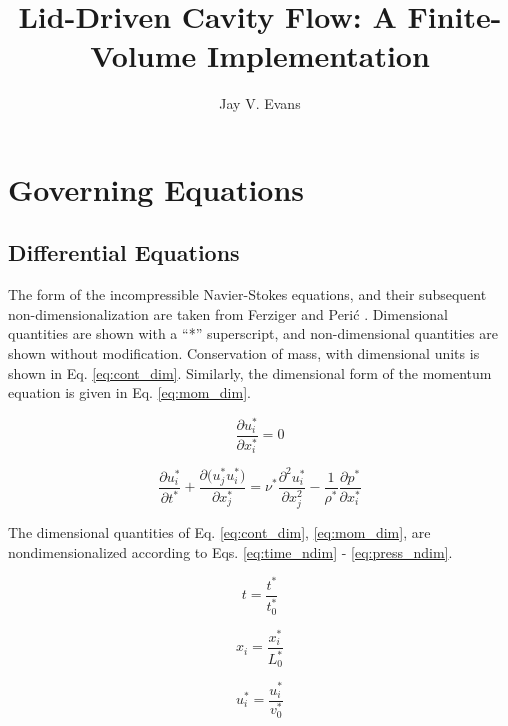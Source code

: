 \documentclass[10pt, letterpaper]{article}
\title{Lid-Driven Cavity Flow: A Finite-Volume Implementation}
\date{}
\author{Jay V. Evans}
\begin{document}
\maketitle


\section{Governing Equations}

\subsection{Differential Equations}

The form of the incompressible Navier-Stokes equations, and their subsequent non-dimensionalization are taken from Ferziger and Perić \cite{Ferziger_Springer_2002}. Dimensional quantities are shown with a ``*'' superscript, and non-dimensional quantities are shown without modification. Conservation of mass, with dimensional units is shown in Eq. \ref{eq:cont_dim}. Similarly, the dimensional form of the momentum equation is given in Eq. \ref{eq:mom_dim}.

\begin{equation}
  \frac{\partial{u_{i}^{*}}}{\partial{x_{i}^{*}}} = 0
  \label{eq:cont_dim}
\end{equation}

\begin{equation}
  \frac{\partial{u_{i}^{*}}}{\partial{t^{*}}} + \frac{\partial{(u_{j}^{*}}u_{i}^{*})}{\partial{x_{j}^{*}}} ={\nu^{*}}\frac{\partial^{2}{u_{i}^{*}}}{\partial{x_{j}^{2}}} - \frac{1}{\rho^{*}}\frac{\partial{p^{*}}}{\partial{x_{i}^{*}}}
  \label{eq:mom_dim}
\end{equation}

The dimensional quantities of Eq. \ref{eq:cont_dim}, \ref{eq:mom_dim}, are nondimensionalized according to Eqs. \ref{eq:time_ndim} - \ref{eq:press_ndim}.

\begin{equation}
  t = \frac{t^{*}}{t_{0}^{*}}
  \label{eq:time_ndim}
\end{equation}


\begin{equation}
  x_{i} = \frac{x_{i}^{*}}{L_{0}^{*}}
  \label{eq:dist_ndim}
\end{equation}


\begin{equation}
  u_{i}^{*} = \frac{u_{i}^{*}}{v_{0}^{*}}
  \label{eq:vel_ndim}
\end{equation}
\end{document}
